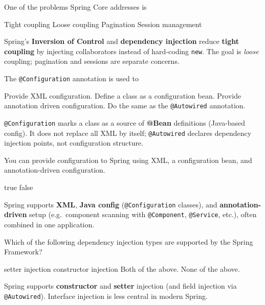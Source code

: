 \question[4]
One of the problems Spring Core addresses is
\begin{choices}
  \CorrectChoice Tight coupling
  \choice Loose coupling
  \choice Pagination
  \choice Session management
\end{choices}
\begin{solution}
  Spring's \textbf{Inversion of Control} and \textbf{dependency injection} reduce \textbf{tight coupling} by injecting collaborators instead of hard-coding \texttt{new}. The goal is \emph{loose} coupling; pagination and sessions are separate concerns.
\end{solution}

\question[4]
The \texttt{@Configuration} annotation is used to
\begin{choices}
  \choice Provide XML configuration.
  \CorrectChoice Define a class as a configuration bean.
  \choice Provide annotation driven configuration.
  \choice Do the same as the \texttt{@Autowired} annotation.
\end{choices}
\begin{solution}
  \texttt{@Configuration} marks a class as a source of \textbf{@Bean} definitions (Java-based config). It does not replace all XML by itself; \texttt{@Autowired} declares dependency injection points, not configuration structure.
\end{solution}

\question[4]
You can provide configuration to Spring using XML, a configuration bean, and annotation-driven configuration.
\begin{choices}
  \CorrectChoice true
  \choice false
\end{choices}
\begin{solution}
  Spring supports \textbf{XML}, \textbf{Java config} (\texttt{@Configuration} classes), and \textbf{annotation-driven} setup (e.g.\ component scanning with \texttt{@Component}, \texttt{@Service}, etc.), often combined in one application.
\end{solution}

\question[4]
Which of the following dependency injection types are supported by the Spring Framework?
\begin{choices}
  \choice setter injection
  \choice constructor injection
  \CorrectChoice Both of the above.
  \choice None of the above.
\end{choices}
\begin{solution}
  Spring supports \textbf{constructor} and \textbf{setter} injection (and field injection via \texttt{@Autowired}). Interface injection is less central in modern Spring.
\end{solution}

